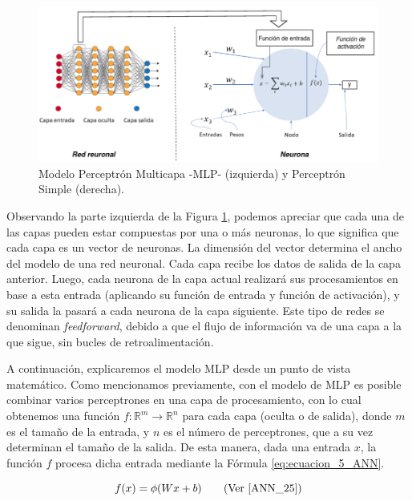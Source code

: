 \documentclass[12pt,a4paper]{article}
\begin{document}
\begin{sloppypar}
\begin{figure}[H]    %
 \centering
 \includegraphics[width=1\textwidth]{images/ANN/3-ANN.png}
 \captionsetup{justification=centering,margin=3cm}
 \caption[Modelo Perceptrón Multicapa -MLP- (izquierda) y Perceptrón Simple (derecha).]{Modelo Perceptrón Multicapa -MLP- (izquierda) y Perceptrón Simple (derecha).}
 \label{fig:ann_3}
\end{figure}

Observando la parte izquierda de la Figura \ref{fig:ann_3}, podemos apreciar que cada una de las capas pueden estar compuestas por una o más neuronas, lo que significa que cada capa es un vector de neuronas. La dimensión del vector determina el ancho del modelo de una red neuronal. Cada capa recibe los datos de salida de la capa anterior. Luego, cada neurona de la capa actual realizará sus procesamientos en base a esta entrada (aplicando su función de entrada y función de activación), y su salida la pasará a cada neurona de la capa siguiente. Este tipo de redes se denominan \textit{feedforward}, debido a que el flujo de información va de una capa a la que sigue, sin bucles de retroalimentación. 

A continuación, explicaremos el modelo MLP desde un punto de vista matemático\cite{ANN_25}. Como mencionamos previamente, con el modelo de MLP es posible combinar varios perceptrones en una capa de procesamiento, con lo cual obtenemos una función $f:\mathbb{R}^m\rightarrow \mathbb{R}^n$ para cada capa (oculta o de salida), donde $m$ es el tamaño de la entrada, y $n$ es el número de perceptrones, que a su vez determinan el tamaño de la salida. De esta manera, dada una entrada $x$, la función $f$ procesa dicha entrada mediante la Fórmula \ref{eq:ecuacion_5_ANN}.

\begin{equation}\label{eq:ecuacion_5_ANN}
f(x) = \phi(Wx+b) \qquad  \text{(Ver \cite{ANN_25})}
\end{equation}


\end{sloppypar}
\end{document}
